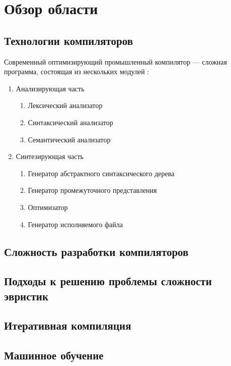 \chapter{Обзор области}
\section{Технологии компиляторов}
Современный оптимизирующий промышленный компилятор --- сложная программа, состоящая из нескольких модулей \cite{Aho:2006:CPT:1177220}:
\begin{enumerate}
	\item Анализирующая часть
	\begin{enumerate}
		\item Лексический анализатор
		\item Синтаксический анализатор
		\item Семантический анализатор
	\end{enumerate}
	\item Синтезирующая часть
	\begin{enumerate}
		\item Генератор абстрактного синтаксического дерева
		\item Генератор промежуточного представления
		\item Оптимизатор
		\item Генератор исполняемого файла
	\end{enumerate}
\end{enumerate}
\section{Сложность разработки компиляторов}
\section{Подходы к решению проблемы сложности эвристик}
\section{Итеративная компиляция}
\section{Машинное обучение}
